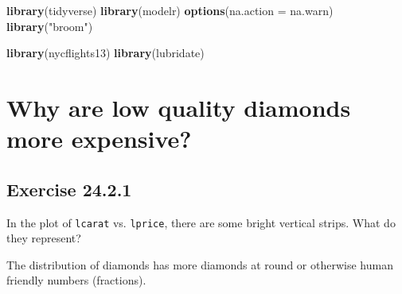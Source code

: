 \documentclass[]{book}
\newenvironment{Shaded}{\begin{snugshade}}{\end{snugshade}}
\newcommand{\DataTypeTok}[1]{\textcolor[rgb]{0.13,0.29,0.53}{#1}}
\newcommand{\FloatTok}[1]{\textcolor[rgb]{0.00,0.00,0.81}{#1}}
\newcommand{\KeywordTok}[1]{\textcolor[rgb]{0.13,0.29,0.53}{\textbf{#1}}}
\newcommand{\NormalTok}[1]{#1}
\newcommand{\OperatorTok}[1]{\textcolor[rgb]{0.81,0.36,0.00}{\textbf{#1}}}
\newcommand{\StringTok}[1]{\textcolor[rgb]{0.31,0.60,0.02}{#1}}
\theoremstyle{plain}
\theoremstyle{remark}
\theoremstyle{definition}
\theoremstyle{definition}
\theoremstyle{definition}
\theoremstyle{remark}
\begin{document}
\begin{Shaded}
\begin{Highlighting}[]
\KeywordTok{library}\NormalTok{(tidyverse)}
\KeywordTok{library}\NormalTok{(modelr)}
\KeywordTok{options}\NormalTok{(}\DataTypeTok{na.action =}\NormalTok{ na.warn)}
\KeywordTok{library}\NormalTok{(}\StringTok{"broom"}\NormalTok{)}

\KeywordTok{library}\NormalTok{(nycflights13)}
\KeywordTok{library}\NormalTok{(lubridate)}
\end{Highlighting}
\end{Shaded}

\hypertarget{why-are-low-quality-diamonds-more-expensive}{%
\section{Why are low quality diamonds more
expensive?}\label{why-are-low-quality-diamonds-more-expensive}}

\begin{Shaded}
\end{Shaded}

\hypertarget{exercise-24.2.1}{%
\subsection*{\texorpdfstring{Exercise
{24.2.1}}{Exercise 24.2.1}}\label{exercise-24.2.1}}

In the plot of \texttt{lcarat} vs. \texttt{lprice}, there are some
bright vertical strips. What do they represent?

The distribution of diamonds has more diamonds at round or otherwise
human friendly numbers (fractions).
\end{document}
